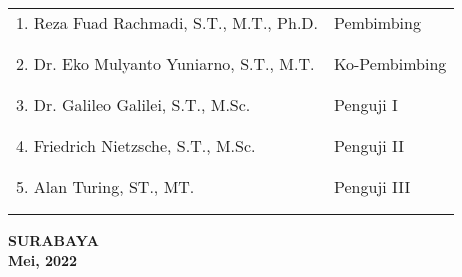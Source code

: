   \begingroup
    \setlength{\tabcolsep}{0pt}

    \noindent
    \begin{tabularx}{\textwidth}{X l}
      1. Reza Fuad Rachmadi, S.T., M.T., Ph.D.          & Pembimbing \\
      &  \\
      &  \\
      2. Dr. Eko Mulyanto Yuniarno, S.T., M.T.     & Ko-Pembimbing \\
      &  \\
      &  \\
      3. Dr. Galileo Galilei, S.T., M.Sc.  & Penguji I \\
      &  \\
      &  \\
      4. Friedrich Nietzsche, S.T., M.Sc.  & Penguji II \\
      &  \\
      &  \\
      5. Alan Turing, ST., MT.             & Penguji III \\
      &  \\
      &  \\
    \end{tabularx}
  \endgroup

  \vspace{12ex}




  \begin{center}
    \textbf{SURABAYA\\Mei, 2022}
  \end{center}
\endgroup
